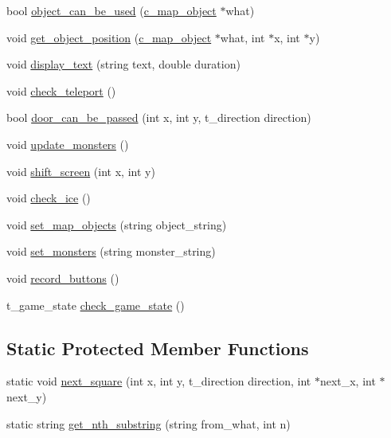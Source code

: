 \begin{DoxyCompactItemize}
\item 
bool \hyperlink{classc__map_a0ed756d1637812842f65138042333d50}{object\-\_\-can\-\_\-be\-\_\-used} (\hyperlink{classc__map__object}{c\-\_\-map\-\_\-object} $\ast$what)
\item 
void \hyperlink{classc__map_a1f90f7d0ebe3228203f68bb3af4be5f0}{get\-\_\-object\-\_\-position} (\hyperlink{classc__map__object}{c\-\_\-map\-\_\-object} $\ast$what, int $\ast$x, int $\ast$y)
\item 
void \hyperlink{classc__map_a4abaca91d31f0eb0fea80c48533f578e}{display\-\_\-text} (string text, double duration)
\item 
void \hyperlink{classc__map_a3a2279cfc3ee5a721073b5b29fcf8e56}{check\-\_\-teleport} ()
\item 
bool \hyperlink{classc__map_ac53831c7f1f8fe285f6dbbc3968ede9c}{door\-\_\-can\-\_\-be\-\_\-passed} (int x, int y, t\-\_\-direction direction)
\item 
void \hyperlink{classc__map_a8cec3eb1eb4d72536aa2c1d9209ca23b}{update\-\_\-monsters} ()
\item 
void \hyperlink{classc__map_aae5774997458b6cd01bebf5ba7578716}{shift\-\_\-screen} (int x, int y)
\item 
void \hyperlink{classc__map_a42f4ffc135ca44bf92e93d3915bee769}{check\-\_\-ice} ()
\item 
void \hyperlink{classc__map_ad1f16a723dfbc854557827b207f7f44a}{set\-\_\-map\-\_\-objects} (string object\-\_\-string)
\item 
void \hyperlink{classc__map_afbef00c25eed696050c8e0fc11c770d5}{set\-\_\-monsters} (string monster\-\_\-string)
\item 
void \hyperlink{classc__map_a1caec6390a6a85a5d98bbb0c89e3ff31}{record\-\_\-buttons} ()
\item 
t\-\_\-game\-\_\-state \hyperlink{classc__map_a6fe5b03607efeac17bca71a27f1767c3}{check\-\_\-game\-\_\-state} ()
\end{DoxyCompactItemize}
\subsection*{Static Protected Member Functions}
\begin{DoxyCompactItemize}
\item 
static void \hyperlink{classc__map_a882c99e5b3a1ce62f68b65dc74be5c62}{next\-\_\-square} (int x, int y, t\-\_\-direction direction, int $\ast$next\-\_\-x, int $\ast$next\-\_\-y)
\item 
static string \hyperlink{classc__map_a1cae0c68558c2830c8775528d7cb0425}{get\-\_\-nth\-\_\-substring} (string from\-\_\-what, int n)
\end{DoxyCompactItemize}
